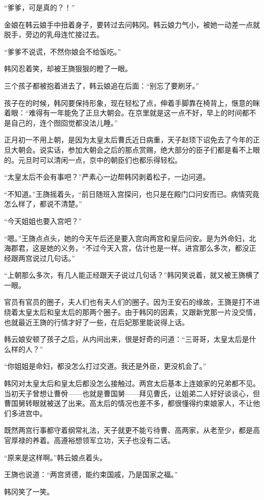 “爹爹，可是真的？！”

金娘在韩云娘手中扭着身子，要转过去问韩冈。韩云娘力气小，被她一动差一点就脱手，旁边的乳母连忙接过去。

“爹爹不说谎，不然你娘会不给饭吃。”

韩冈忍着笑，却被王旖狠狠的瞪了一眼。

三个孩子都被抱着进去了，韩云娘追在后面：“别忘了要刷牙。”

孩子在的时候，韩冈要保持形象，现在轻松了点，伸着手脚靠在椅背上，惬意的眯着眼：“难得有一年能免了正旦大朝会。在京里就是这一点不好，早上的时间都不是自己的，连个囫囵觉都没法儿睡。”

正月初一不用上朝，是因为太皇太后曹氏近日病重，天子赵顼下诏免去了今年的正旦大朝会。说实话，参加大朝会之后的那点赏赐，绝大部分的臣子们都是看不上眼的。元旦时可以清闲一点，京中的朝臣们也都乐得轻松。

“太皇太后不会有事吧？”严素心一边帮韩冈剥着松子，一边问道。

“不知道。”王旖摇着头，“前日随班入宫探问，也只是在殿门口问安而已。病情究竟怎么样了，都说不清楚。”

“今天姐姐也要入宫吧？”

“嗯。”王旖点点头，她的今天午后还是要入宫向两宫和皇后问安。是为外命妇，北海郡君，这是她的义务，“不过今天入宫，估计也是一样。进宫那么多次，都没正经跟两宫说过几句话。”

“上朝那么多次，有几人能正经跟天子说过几句话？”韩冈笑说着，就又被王旖横了一眼。

官员有官员的圈子，夫人们也有夫人们的圈子。因为王安石的缘故，王旖是打不进绕着太皇太后和皇太后的那两个圈子。由于韩冈的因素，又跟新党那一片没交情，也就最近王旖的行情才好了一些，在后妃那里能说得上话。

韩云娘安顿了孩子之后，从内间出来，很是好奇的问道：“三哥哥，太皇太后是什么样的人？”

“你姐姐是命妇，都没怎么打过交道。我还是外臣，更没机会了。”

韩冈对太皇太后和皇太后都没怎么接触过。两宫太后基本上连娘家的兄弟都不见。当初天子曾想让曹佾——也就是曹国舅——拜见曹氏，让姐弟二人好好谈谈心，但曹国舅转眼就被送了出来。高太后的情况也差不多，都很懂得约束娘家人，不让他们多进宫中。

既然两宫行事都守着纲常礼法，天子就更不能亏待曹、高两家，从老至少，都是高官厚禄的养着。高遵裕想领军立功，天子也没有二话。

“原来是这样啊。”韩云娘点着头。

王旖也说道：“两宫贤德，能约束国戚，乃是国家之福。”

韩冈笑了一笑。


